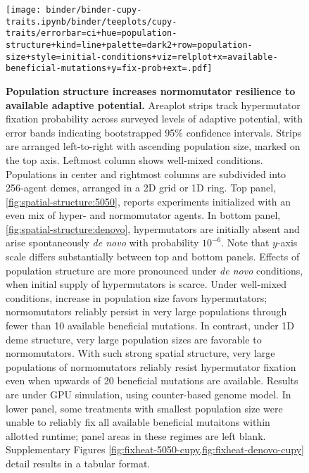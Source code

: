 \begin{figure}[h]
\begin{minipage}{\textwidth}
  \texttt{[image: binder/binder-cupy-traits.ipynb/binder/teeplots/cupy-traits/errorbar=ci+hue=population-structure+kind=line+palette=dark2+row=population-size+style=initial-conditions+viz=relplot+x=available-beneficial-mutations+y=fix-prob+ext=.pdf]}%
\end{minipage}

\begin{minipage}{\textwidth}
  \caption{%
    \textbf{Population structure increases normomutator resilience to available adaptive potential.}
    \footnotesize
    Areaplot strips track hypermutator fixation probability across surveyed levels of adaptive potential, with error bands indicating bootstrapped 95\% confidence intervals.
    Strips are arranged left-to-right with ascending population size, marked on the top axis.
    Leftmost column shows well-mixed conditions.
    Populations in center and rightmost columns are subdivided into 256-agent demes, arranged in a 2D grid or 1D ring.
    Top panel, \ref{fig:spatial-structure:5050}, reports experiments initialized with an even mix of hyper- and normomutator agents.
    In bottom panel, \ref{fig:spatial-structure:denovo}, hypermutators are initially absent and arise spontaneously \textit{de novo} with probability $10^{-6}$.
    Note that $y$-axis scale differs substantially between top and bottom panels.
    Effects of population structure are more pronounced under \textit{de novo} conditions, when initial supply of hypermutators is scarce.
    Under well-mixed conditions, increase in population size favors hypermutators; normomutators reliably persist in very large populations through fewer than 10 available beneficial mutations.
    In contrast, under 1D deme structure, very large population sizes are favorable to normomutators.
    With such strong spatial structure, very large populations of normomutators reliably resist hypermutator fixation even when upwards of 20 beneficial mutations are available.
    Results are under GPU simulation, using counter-based genome model.
    In lower panel, some treatments with smallest population size were unable to reliably fix all available beneficial mutaitons within allotted runtime; panel areas in these regimes are left blank.
    Supplementary Figures \cref{fig:fixheat-5050-cupy,fig:fixheat-denovo-cupy} detail results in a tabular format.
  }
  \label{fig:spatial-structure-combined}
\end{minipage}
\end{figure}
